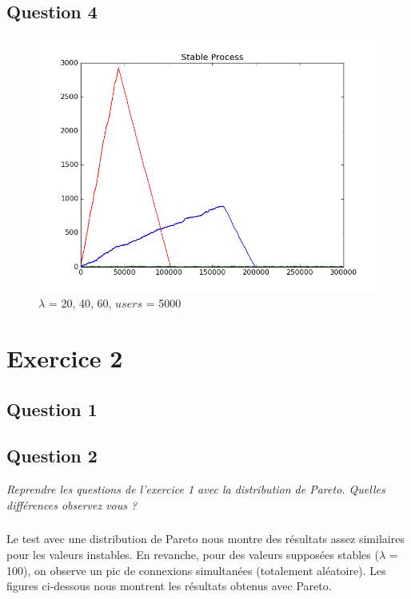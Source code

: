 \documentclass[12pt]{article}
\begin{document}
\subsection{Question 4}
\begin{figure}[H]
\centering
\includegraphics[scale=0.50]{3lambda.png}
\caption{\label{fig:rf_taille_noeud} $\lambda$ = 20, 40, 60, $users$ = 5000}
\end{figure}


\section{Exercice 2}
\subsection{Question 1}
\subsection{Question 2}
\textit{Reprendre les questions de l’exercice 1 avec la distribution de Pareto. Quelles différences observez vous ?}

\subsubsection{}
Le test avec une distribution de Pareto nous montre des résultats assez similaires pour les valeurs instables. En revanche, pour des valeurs supposées stables ($\lambda$ = 100), on observe un pic de connexions simultanées (totalement aléatoire). Les figures ci-dessous nous montrent les résultats obtenus avec Pareto.
\end{document}
